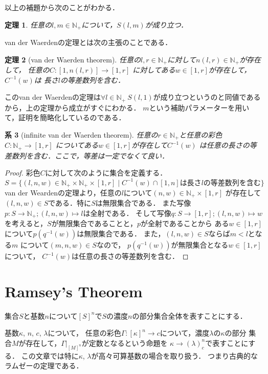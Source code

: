 \documentclass[leqno, 12pt]{jsarticle}
\newtheorem{thm}{定理}
\newtheorem{cor}[thm]{系}
\newcommand{\nn}{\mathbb{N}}
\begin{document}
以上の補題から次のことがわかる．
\begin{thm}
任意の$l,  m\in \nn_{+}$について，$S(l, m)$が成り立つ．
\end{thm}

van der Waerdenの定理とは次の主張のことである．
\begin{thm}[van der Waerden theorem]
任意の$l, r\in \nn_+$に対して$n(l, r)\in \nn_+$が存在して，
任意の$C: [1, n(l, r)]\to [1, r]$
に対してある$w\in [1, r]$が存在して，$C^{-1}(w)$は
長さ$l$の等差数列を含む．
\end{thm}
このvan der Waerdenの定理は$\forall l\in \nn_+\  S(l, 1)$が成り立つというのと同値であるから，上の定理から成立がすぐにわかる．
$m$という補助パラメーターを用いて，証明を簡略化しているのである．

\begin{cor}[infinite van der Waerden theorem]
任意の$r\in \nn_{+}$と任意の彩色$C:\nn_+\to [1, r]$
についてある$w\in [1,r]$が存在して$C^{-1}(w)$
は任意の長さの等差数列を含む．ここで，等差は一定でなくて良い．
\end{cor}
\begin{proof}
彩色$C$に対して次のように集合を定義する．
\[
S=\{(l, n, w)\in \nn_{+}\times\nn_{+}\times  [1, r]\mid \text{$C^{-1}(w)\cap [1, n]$は長さ$l$の等差数列を含む}\}
\]
van der Weardenの定理より，任意の$l$について$(n, w)\in \nn_{+}\times [1, r]$
が存在して$(l, n, w)\in S$である．特に$S$は無限集合である．
また写像$p: S\to \nn_{+}; (l, n, w)\mapsto l$は全射である．
そして写像$q: S\to [1, r]; (l, n, w)\mapsto w$
を考えると，$S$が無限集合であることと，$p$が全射であることから
ある$w\in [1, r]$について$p(q^{-1}(w))$は無限集合である．
また，$(l, n, w)\in S$ならば$m<l$となる$m$
について$(m, n, w)\in S$なので，
$p(q^{-1}(w))$が無限集合となる$w\in [1, r]$について，
$C^{-1}(w)$は任意の長さの等差数列を含む．
\end{proof}

\section{Ramsey's Theorem}
集合$S$と基数$n$について$[S]^n$で$S$の濃度$n$の部分集合全体を表すことにする．

基数$\kappa$, $n$, $c$, $\lambda$について，
任意の彩色$\Gamma: [\kappa]^n\to c$について，濃度$\lambda$の$\kappa$の部分
集合$M$が存在して，$\Gamma|_{[M]^n}$が定数となるという命題を
$\kappa\to (\lambda)_c^n$で表すことにする．
この文章では特に$\kappa$, $\lambda$が高々可算基数の場合を取り扱う．
つまり古典的なラムゼーの定理である．
\end{document}

